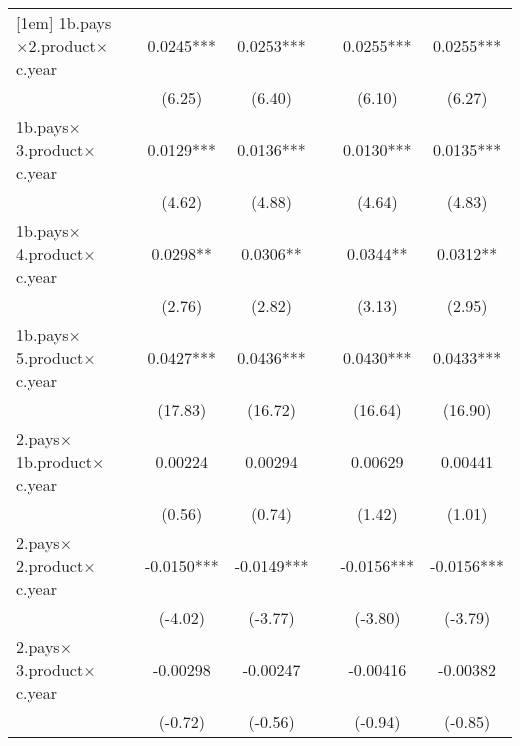 {\begin{tabular}{l*{6}{c}}
[1em]
1b.pays$\times$2.product$\times$c.year&                     &      0.0245***&      0.0253***&                     &      0.0255***&      0.0255***\\
                    &                     &      (6.25)         &      (6.40)         &                     &      (6.10)         &      (6.27)         \\
[1em]
1b.pays$\times$3.product$\times$c.year&                     &      0.0129***&      0.0136***&                     &      0.0130***&      0.0135***\\
                    &                     &      (4.62)         &      (4.88)         &                     &      (4.64)         &      (4.83)         \\
[1em]
1b.pays$\times$4.product$\times$c.year&                     &      0.0298** &      0.0306** &                     &      0.0344** &      0.0312** \\
                    &                     &      (2.76)         &      (2.82)         &                     &      (3.13)         &      (2.95)         \\
[1em]
1b.pays$\times$5.product$\times$c.year&                     &      0.0427***&      0.0436***&                     &      0.0430***&      0.0433***\\
                    &                     &     (17.83)         &     (16.72)         &                     &     (16.64)         &     (16.90)         \\
[1em]
2.pays$\times$1b.product$\times$c.year&                     &     0.00224         &     0.00294         &                     &     0.00629         &     0.00441         \\
                    &                     &      (0.56)         &      (0.74)         &                     &      (1.42)         &      (1.01)         \\
[1em]
2.pays$\times$2.product$\times$c.year&                     &     -0.0150***&     -0.0149***&                     &     -0.0156***&     -0.0156***\\
                    &                     &     (-4.02)         &     (-3.77)         &                     &     (-3.80)         &     (-3.79)         \\
[1em]
2.pays$\times$3.product$\times$c.year&                     &    -0.00298         &    -0.00247         &                     &    -0.00416         &    -0.00382         \\
                    &                     &     (-0.72)         &     (-0.56)         &                     &     (-0.94)         &     (-0.85)         \\

\end{tabular}}
